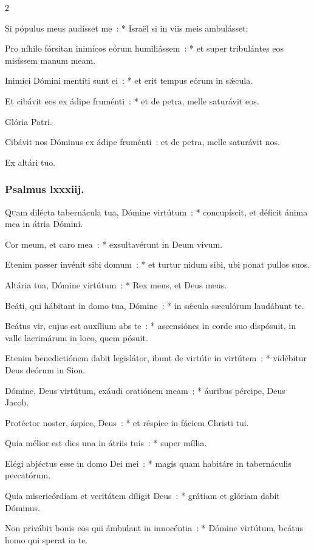 \documentclass[9pt,twoside]{extarticle}
\begin{document}
\begin{multicols}{2}
{{Si pópulus meus audísset me~: * Israël si in viis meis ambulásset:

Pro níhilo fórsitan inimícos eórum humiliássem~: * et super tribulántes eos misíssem manum meam.

Inimíci Dómini mentíti sunt ei~: * et erit tempus eórum in sǽcula.

Et cibávit eos ex ádipe fruménti~: * et de petra, melle saturávit eos.

Glória Patri.

\begin{tightlist}{}
\item {} Cibávit nos Dóminus ex ádipe fruménti~: et de petra, melle saturávit nos.
\item {} Ex altári tuo.
\end{tightlist}

\subsubsection*{\center Psalmus lxxxiij.}
\lettrine{Q}uam dilécta tabernácula tua, Dómine virtútum~: * concupíscit, et déficit ánima mea in átria Dómini.

Cor meum, et caro mea~: * exsultavérunt in Deum vivum.

Etenim passer invénit sibi domum~: * et turtur nidum sibi, ubi ponat pullos suos.

Altária tua, Dómine virtútum~: * Rex meus, et Deus meus.

Beáti, qui hábitant in domo tua, Dómine~: * in sǽcula sæculórum laudábunt te.

Beátus vir, cujus est auxílium abs te~: * ascensiónes in corde suo dispósuit, in valle lacrimárum in loco, quem pósuit.

Etenim benedictiónem dabit legislátor, ibunt de virtúte in virtútem~: * vidébitur Deus deórum in Sion.

Dómine, Deus virtútum, exáudi oratiónem meam~: * áuribus pércipe, Deus Jacob.

Protéctor noster, áspice, Deus~: * et réspice in fáciem Christi tui.

Quia mélior est dies una in átriis tuis~: * super míllia.

Elégi abjéctus esse in domo Dei mei~: * magis quam habitáre in tabernáculis peccatórum.

Quia misericórdiam et veritátem díligit Deus~: * grátiam et glóriam dabit Dóminus.

Non privábit bonis eos qui ámbulant in innocéntia~: * Dómine virtútum, beátus homo qui sperat in te.

}}
\end{multicols}
\end{document}
